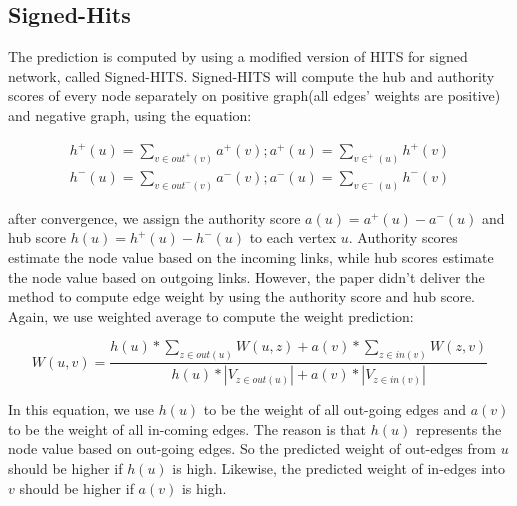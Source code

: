 
\subsection{Signed-Hits}

The prediction is computed by using a modified version of HITS for signed network, called Signed-HITS\cite{shahriari2014ranking}. Signed-HITS will compute the hub and authority scores of every node separately on positive graph(all edges' weights are positive) and negative graph, using the equation:

\begin{equation}
\begin{aligned}
h^+(u) = \sum_{v\in out^+(v)}{a^+(v)} ; a^+(u) = \sum_{v\in ^+(u)}{h^+(v)}\\
h^-(u) = \sum_{v\in out^-(v)}{a^-(v)} ; a^-(u) = \sum_{v\in ^-(u)}{h^-(v)}
\end{aligned}
\end{equation}

after convergence, we assign the authority score $a(u)=a^+(u)-a^-(u)$ and hub score $h(u)=h^+(u)-h^-(u)$ to each vertex $u$. Authority scores estimate the node value based on the incoming links, while hub scores estimate the node value based on outgoing links. However, the paper\cite{kumar2016edge} didn't deliver the method to compute edge weight by using the authority score and hub score. Again, we use weighted average to compute the weight prediction:

\begin{equation}
W(u,v) = \frac{h(u)*\sum_{z\in out(u)} W(u,z) + a(v)*\sum_{z\in in(v)} W(z,v)}{h(u) * |V_{z\in out(u)}| + a(v) * |V_{z\in in(v)}|}
\end{equation}

In this equation, we use $h(u)$ to be the weight of all out-going edges and $a(v)$ to be the weight of all in-coming edges. The reason is that $h(u)$ represents the node value based on out-going edges. So the predicted weight of out-edges from $u$ should be higher if $h(u)$ is high. Likewise, the predicted weight of in-edges into $v$ should be higher if $a(v)$ is high.